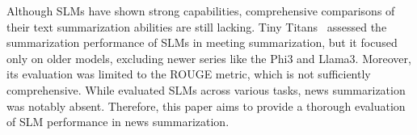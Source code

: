 Although SLMs have shown strong capabilities, comprehensive comparisons of their text summarization abilities are still lacking. Tiny Titans~\cite{tiny_titan} assessed the summarization performance of SLMs in meeting summarization, but it focused only on older models, excluding newer series like the Phi3 and Llama3. Moreover, its evaluation was limited to the ROUGE metric, which is not sufficiently comprehensive. While \citet{lu2024smalllanguagemodelssurvey} evaluated SLMs across various tasks, news summarization was notably absent. Therefore, this paper aims to provide a thorough evaluation of SLM performance in news summarization.




